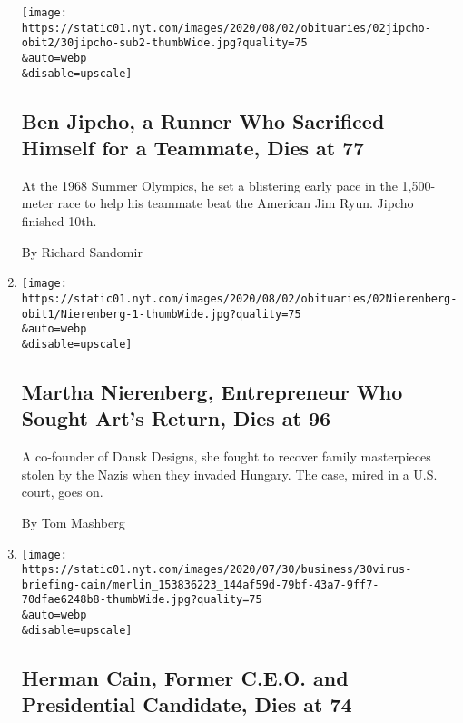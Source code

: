 \begin{enumerate}
  \texttt{[image: https://static01.nyt.com/images/2020/08/02/obituaries/02jipcho-obit2/30jipcho-sub2-thumbWide.jpg?quality=75\\\&auto=webp\\\&disable=upscale]}

  \hypertarget{ben-jipcho-a-runner-who-sacrificed-himself-for-a-teammate-dies-at-77}{%
  \subsection{Ben Jipcho, a Runner Who Sacrificed Himself for a
  Teammate, Dies at
  77}\label{ben-jipcho-a-runner-who-sacrificed-himself-for-a-teammate-dies-at-77}}

  At the 1968 Summer Olympics, he set a blistering early pace in the
  1,500-meter race to help his teammate beat the American Jim Ryun.
  Jipcho finished 10th.

  By Richard Sandomir
\item
  \href{/2020/07/30/arts/martha-nierenberg-entrepreneur-who-sought-arts-return-dies-at-96.html}{}

  \texttt{[image: https://static01.nyt.com/images/2020/08/02/obituaries/02Nierenberg-obit1/Nierenberg-1-thumbWide.jpg?quality=75\\\&auto=webp\\\&disable=upscale]}

  \hypertarget{martha-nierenberg-entrepreneur-who-sought-arts-return-dies-at-96}{%
  \subsection{Martha Nierenberg, Entrepreneur Who Sought Art's Return,
  Dies at
  96}\label{martha-nierenberg-entrepreneur-who-sought-arts-return-dies-at-96}}

  A co-founder of Dansk Designs, she fought to recover family
  masterpieces stolen by the Nazis when they invaded Hungary. The case,
  mired in a U.S. court, goes on.

  By Tom Mashberg
\item
  \href{/2020/07/30/us/politics/herman-cain-dead.html}{}

  \texttt{[image: https://static01.nyt.com/images/2020/07/30/business/30virus-briefing-cain/merlin\_153836223\_144af59d-79bf-43a7-9ff7-70dfae6248b8-thumbWide.jpg?quality=75\\\&auto=webp\\\&disable=upscale]}

  \hypertarget{herman-cain-former-ceo-and-presidential-candidate-dies-at-74}{%
  \subsection{Herman Cain, Former C.E.O. and Presidential Candidate,
  Dies at
  74}\label{herman-cain-former-ceo-and-presidential-candidate-dies-at-74}}


\end{enumerate}
